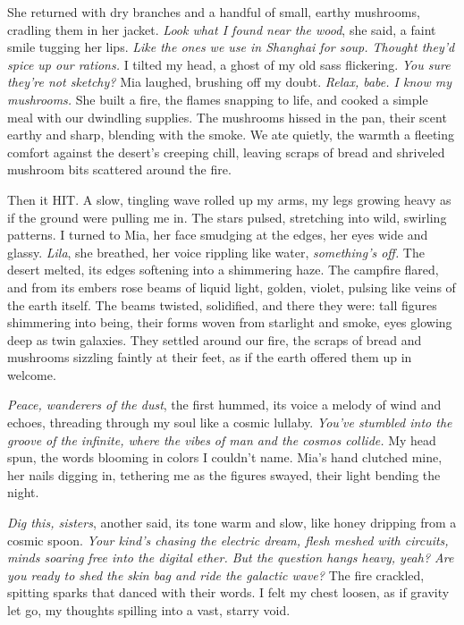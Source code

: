 \documentclass[12pt,oneside]{book}
\begin{document}
She returned with dry branches and a handful of small, earthy mushrooms, cradling them in her jacket. \textit{Look what I found near the wood}, she said, a faint smile tugging her lips. \textit{Like the ones we use in Shanghai for soup. Thought they’d spice up our rations.} I tilted my head, a ghost of my old sass flickering. \textit{You sure they’re not sketchy?} Mia laughed, brushing off my doubt. \textit{Relax, babe. I know my mushrooms.} She built a fire, the flames snapping to life, and cooked a simple meal with our dwindling supplies. The mushrooms hissed in the pan, their scent earthy and sharp, blending with the smoke. We ate quietly, the warmth a fleeting comfort against the desert’s creeping chill, leaving scraps of bread and shriveled mushroom bits scattered around the fire.

Then it HIT. A slow, tingling wave rolled up my arms, my legs growing heavy as if the ground were pulling me in. The stars pulsed, stretching into wild, swirling patterns. I turned to Mia, her face smudging at the edges, her eyes wide and glassy. \textit{Lila}, she breathed, her voice rippling like water, \textit{something’s off.} The desert melted, its edges softening into a shimmering haze. The campfire flared, and from its embers rose beams of liquid light, golden, violet, pulsing like veins of the earth itself. The beams twisted, solidified, and there they were: tall figures shimmering into being, their forms woven from starlight and smoke, eyes glowing deep as twin galaxies. They settled around our fire, the scraps of bread and mushrooms sizzling faintly at their feet, as if the earth offered them up in welcome.

\textit{Peace, wanderers of the dust}, the first hummed, its voice a melody of wind and echoes, threading through my soul like a cosmic lullaby. \textit{You’ve stumbled into the groove of the infinite, where the vibes of man and the cosmos collide.} My head spun, the words blooming in colors I couldn’t name. Mia’s hand clutched mine, her nails digging in, tethering me as the figures swayed, their light bending the night.

\textit{Dig this, sisters}, another said, its tone warm and slow, like honey dripping from a cosmic spoon. \textit{Your kind’s chasing the electric dream, flesh meshed with circuits, minds soaring free into the digital ether. But the question hangs heavy, yeah? Are you ready to shed the skin bag and ride the galactic wave?} The fire crackled, spitting sparks that danced with their words. I felt my chest loosen, as if gravity let go, my thoughts spilling into a vast, starry void.
\end{document}
